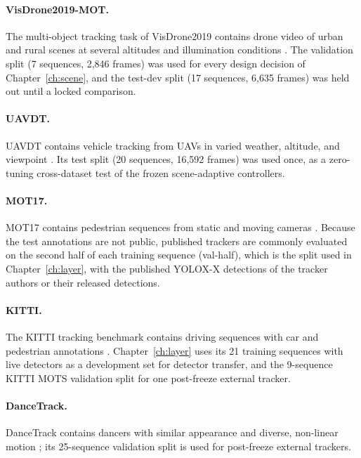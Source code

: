 \paragraph{VisDrone2019-MOT.} The multi-object tracking task of VisDrone2019 contains drone video of urban and rural scenes at several altitudes and illumination conditions \cite{zhu2022visdrone}. The validation split (7 sequences, 2,846 frames) was used for every design decision of Chapter~\ref{ch:scene}, and the test-dev split (17 sequences, 6,635 frames) was held out until a locked comparison.

\paragraph{UAVDT.} UAVDT contains vehicle tracking from UAVs in varied weather, altitude, and viewpoint \cite{du2018uavdt}. Its test split (20 sequences, 16,592 frames) was used once, as a zero-tuning cross-dataset test of the frozen scene-adaptive controllers.

\paragraph{MOT17.} MOT17 contains pedestrian sequences from static and moving cameras \cite{milan2016mot16,dendorfer2021motchallenge}. Because the test annotations are not public, published trackers are commonly evaluated on the second half of each training sequence (val-half), which is the split used in Chapter~\ref{ch:layer}, with the published YOLOX-X detections of the tracker authors or their released detections.

\paragraph{KITTI.} The KITTI tracking benchmark contains driving sequences with car and pedestrian annotations \cite{geiger2012kitti}. Chapter~\ref{ch:layer} uses its 21 training sequences with live detectors as a development set for detector transfer, and the 9-sequence KITTI MOTS validation split for one post-freeze external tracker.

\paragraph{DanceTrack.} DanceTrack contains dancers with similar appearance and diverse, non-linear motion \cite{sun2022dancetrack}; its 25-sequence validation split is used for post-freeze external trackers.

